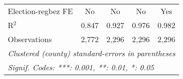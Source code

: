 \begin{table}[htbp]
\begin{tabular}{lcccc}
      Election-regbez FE                      & No            & No            & No            & Yes\\  
      R$^2$                                   & 0.847         & 0.927         & 0.976         & 0.982\\  
      Observations                            & 2,772         & 2,296         & 2,296         & 2,296\\  
      \midrule \midrule
      \multicolumn{5}{l}{\emph{Clustered (county) standard-errors in parentheses}}\\
      \multicolumn{5}{l}{\emph{Signif. Codes: ***: 0.001, **: 0.01, *: 0.05}}\\
   \end{tabular}
\end{table}




